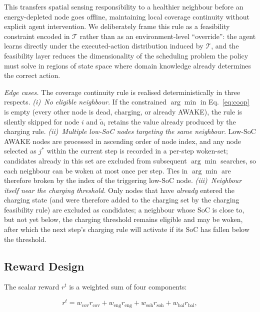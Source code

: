 \documentclass[journal]{IEEEtran}
\begin{document}
This transfers spatial sensing responsibility to a healthier neighbour
before an energy-depleted node goes offline, maintaining local coverage
continuity without explicit agent intervention. We deliberately frame
this rule as a feasibility constraint encoded in $\mathcal{T}$ rather
than as an environment-level ``override'': the agent learns directly
under the executed-action distribution induced by $\mathcal{T}$, and
the feasibility layer reduces the dimensionality of the scheduling
problem the policy must solve in regions of state space where domain
knowledge already determines the correct action.

\textit{Edge cases.} The coverage continuity rule is realised
deterministically in three respects. \emph{(i)~No eligible
neighbour.} If the constrained $\arg\min$ in Eq.~\eqref{eq:coop} is
empty (every other node is dead, charging, or already AWAKE), the
rule is silently skipped for node $i$ and $\tilde{a}_i$ retains the
value already produced by the charging rule. \emph{(ii)~Multiple
low-SoC nodes targeting the same neighbour.} Low-SoC AWAKE nodes are
processed in ascending order of node index, and any node selected as
$j^*$ within the current step is recorded in a per-step woken-set;
candidates already in this set are excluded from subsequent
$\arg\min$ searches, so each neighbour can be woken at most once per
step. Ties in $\arg\min$ are therefore broken by the index of the
triggering low-SoC node. \emph{(iii)~Neighbour itself near the
charging threshold.} Only nodes that have \emph{already} entered the
charging state (and were therefore added to the charging set by the
charging feasibility rule) are excluded as candidates; a neighbour
whose SoC is close to, but not yet below, the charging threshold
remains eligible and may be woken, after which the next step's
charging rule will activate if its SoC has fallen below the
threshold.

\subsection{Reward Design}
\label{sec:reward}

The scalar reward $r^t$ is a weighted sum of four components:

\begin{equation}
  r^t = w_{\text{cov}} r_{\text{cov}}
      + w_{\text{eng}} r_{\text{eng}}
      + w_{\text{soh}} r_{\text{soh}}
      + w_{\text{bal}} r_{\text{bal}},
  \label{eq:reward}
\end{equation}
\end{document}
